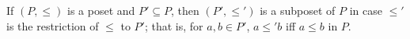 If $(P, \leq)$ is a poset and $P' \subseteq P$, then $(P', \leq')$ is a subposet of $P$ in case $\leq'$ is the restriction of $\leq$ to $P'$; that is, for $a, b \in P'$, $a \leq' b$ iff $a \leq b$ in $P$.
